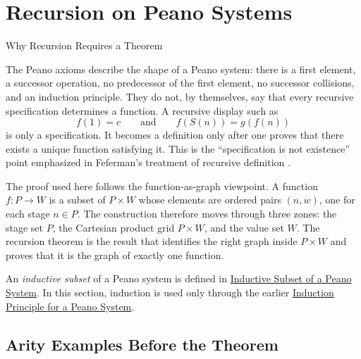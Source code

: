 \section{Recursion on Peano Systems}

\begin{topicbox}{Why Recursion Requires a Theorem}
\begin{exposition}
The Peano axioms describe the shape of a Peano system: there is a first
element, a successor operation, no predecessor of the first element, no
successor collisions, and an induction principle. They do not, by themselves,
say that every recursive specification determines a function. A recursive
display such as
\[
f(1)=c
\qquad\text{and}\qquad
f(S(n))=g(f(n))
\]
is only a specification. It becomes a definition only after one proves that
there exists a unique function satisfying it. This is the ``specification is
not existence'' point emphasized in Feferman's treatment of recursive
definition \cite[p.~67]{FefermanNumberSystems1964}.

The proof used here follows the function-as-graph viewpoint. A function
$f:P\to W$ is a subset of $P\times W$ whose elements are ordered pairs
$(n,w)$, one for each stage $n\in P$. The construction therefore moves through
three zones: the stage set $P$, the Cartesian product grid $P\times W$, and
the value set $W$. The recursion theorem is the result that identifies the
right graph inside $P\times W$ and proves that it is the graph of exactly one
function.
\end{exposition}

\begin{remark*}
An \emph{inductive subset} of a Peano system is defined in
\hyperref[def:inductive-subset-of-peano-system]{Inductive Subset of a Peano
System}. In this section, induction is used only through the earlier
\hyperref[thm:induction-principle-for-peano-system]{Induction Principle for a
Peano System}.
\end{remark*}
\end{topicbox}

\subsection{Arity Examples Before the Theorem}

